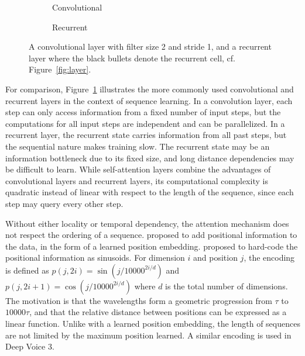 \documentclass[11pt]{article}
\begin{document}
\begin{figure}
\begin{subfigure}{0.5\textwidth}
\centering
{}
\caption*{Convolutional}
\end{subfigure}%
\begin{subfigure}{0.5\textwidth}
\centering
{}
\caption*{Recurrent}
\end{subfigure}
\caption[]{\label{fig:conv-rec}A convolutional layer with filter size 2 and stride 1,
and a recurrent layer where the black bullets denote the recurrent cell,
cf. Figure~\ref{fig:layer}.}
\end{figure}

For comparison, Figure~\ref{fig:conv-rec} illustrates the more commonly used convolutional and recurrent layers
in the context of sequence learning.
In a convolution layer, each step can only access information from a fixed number of input steps,
but the computations for all input steps are independent and can be parallelized.
In a recurrent layer, the recurrent state carries information from all past steps,
but the sequential nature makes training slow.
The recurrent state may be an information bottleneck due to its fixed size,
and long distance dependencies may be difficult to learn.
While self-attention layers combine the advantages of convolutional layers and recurrent layers,
its computational complexity is quadratic instead of linear with respect to the length of the sequence,
since each step may query every other step.

Without either locality or temporal dependency,
the attention mechanism does not respect the ordering of a sequence.
\textcite{gehring2017convolutional} proposed to add positional information to the data,
in the form of a learned position embedding.
\textcite{vaswani2017attention} proposed to hard-code the positional information as sinusoids.
For dimension \(i\) and position \(j\), the encoding is defined as
\(p(j, 2i) = \sin \left( j / 10000^{2i/d} \right)\) and
\(p(j, 2i+1) = \cos \left( j / 10000^{2i/d} \right)\)
where \(d\) is the total number of dimensions.
The motivation is that the wavelengths form a geometric progression from \(\tau\) to \(10000 \tau\),
and that the relative distance between positions can be expressed as a linear function.
Unlike with a learned position embedding,
the length of sequences are not limited by the maximum position learned.
A similar encoding is used in Deep Voice 3.
\end{document}

